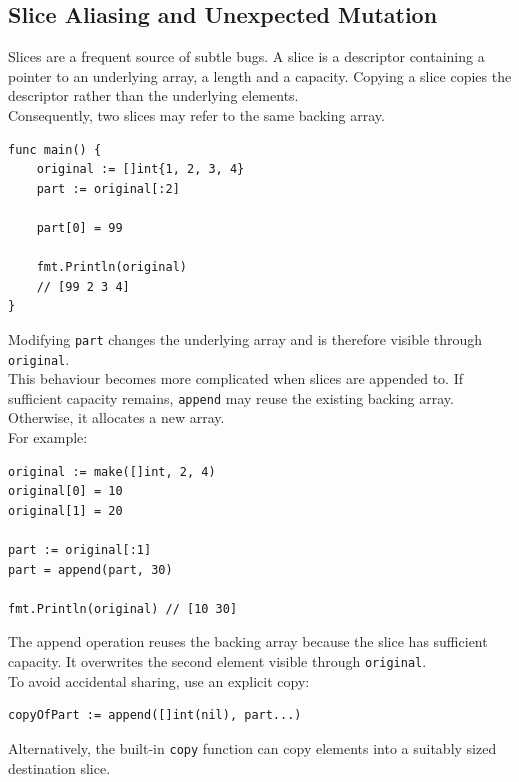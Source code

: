 \subsection{Slice Aliasing and Unexpected Mutation}

Slices are a frequent source of subtle bugs. A slice is a descriptor containing a pointer to an underlying array, a length and a capacity. Copying a slice copies the descriptor rather than the underlying elements.\\

Consequently, two slices may refer to the same backing array.

\begin{lstlisting}
func main() {
    original := []int{1, 2, 3, 4}
    part := original[:2]

    part[0] = 99

    fmt.Println(original)
    // [99 2 3 4]
}
\end{lstlisting}

Modifying \texttt{part} changes the underlying array and is therefore visible through \texttt{original}.\\

This behaviour becomes more complicated when slices are appended to. If sufficient capacity remains, \texttt{append} may reuse the existing backing array. Otherwise, it allocates a new array.\\

For example:

\begin{lstlisting}
original := make([]int, 2, 4)
original[0] = 10
original[1] = 20

part := original[:1]
part = append(part, 30)

fmt.Println(original) // [10 30]
\end{lstlisting}

The append operation reuses the backing array because the slice has sufficient capacity. It overwrites the second element visible through \texttt{original}.\\

To avoid accidental sharing, use an explicit copy:

\begin{lstlisting}
copyOfPart := append([]int(nil), part...)
\end{lstlisting}

Alternatively, the built-in \texttt{copy} function can copy elements into a suitably sized destination slice.\\

